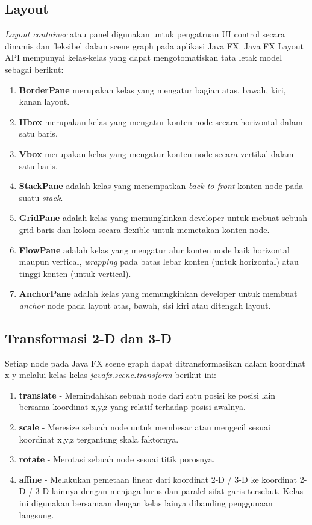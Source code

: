 \subsection{Layout}
 \textit{Layout container} atau panel digunakan untuk pengatruan UI control secara dinamis dan fleksibel dalam scene graph pada aplikasi Java FX. Java FX Layout API mempunyai kelas-kelas yang dapat mengotomatiskan tata letak model sebagai berikut:\cite{javafx}
\begin{enumerate}
	\item \textbf{BorderPane} merupakan kelas yang mengatur bagian atas, bawah, kiri, kanan layout.
	\item \textbf{Hbox} merupakan kelas yang mengatur konten node secara horizontal dalam satu baris.
	\item  \textbf{Vbox} merupakan kelas yang mengatur konten node secara vertikal dalam satu baris.
	\item \textbf{StackPane} adalah kelas yang menempatkan \textit{back-to-front} konten node pada suatu \textit{stack}.
	\item \textbf{GridPane} adalah kelas yang memungkinkan developer untuk mebuat sebuah grid baris dan kolom secara flexible untuk memetakan konten node.
	\item \textbf{FlowPane} adalah kelas yang mengatur alur konten node baik horizontal maupun vertical, \textit{wrapping} pada batas lebar konten (untuk horizontal) atau tinggi konten (untuk vertical).
	\item \textbf{AnchorPane} adalah kelas yang memungkinkan developer untuk membuat \textit{anchor} node pada layout atas, bawah, sisi kiri atau ditengah layout. 
\end{enumerate}

\subsection{Transformasi 2-D dan 3-D}
Setiap node pada Java FX scene graph dapat ditransformasikan dalam koordinat x-y melalui kelas-kelas \textit{javafx.scene.transform} berikut ini:\cite{javafx}
\begin{enumerate}
	\item \textbf{translate} - Memindahkan sebuah node dari satu posisi ke posisi lain bersama koordinat x,y,z yang relatif terhadap posisi awalnya.
	\item \textbf{scale} - Meresize sebuah node untuk membesar atau mengecil sesuai koordinat x,y,z tergantung skala faktornya.
	\item \textbf{rotate} - Merotasi sebuah node sesuai titik porosnya.
	\item \textbf{affine} - Melakukan pemetaan linear dari koordinat 2-D / 3-D ke koordinat 2-D / 3-D lainnya dengan menjaga lurus dan paralel sifat garis tersebut. Kelas ini digunakan bersamaan dengan kelas lainya dibanding penggunaan langsung.
\end{enumerate}

